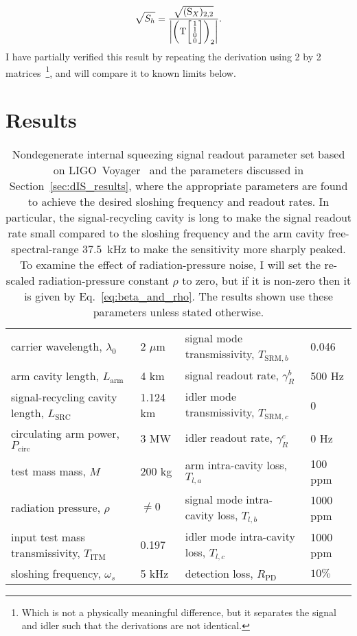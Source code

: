 \begin{equation}\label{eq:nIS_sigRO_sens}
\sqrt{S_h} = \frac{\sqrt{(\text{S}_X)_{2,2}}}{\abs{\left(\text{T}\begin{bsmallmatrix}1 \\1\\0\\0\end{bsmallmatrix}\right)_2}}.
\end{equation}
I have partially verified this result by repeating the derivation using 2 by 2 matrices~\footnote{Which is not a physically meaningful difference, but it separates the signal and idler such that the derivations are not identical.}, and will compare it to known limits below. %


\section{Results}
\label{sec:nIS_sigRO_results}

\begin{table}[]
\centering
\begin{tabular}{@{}ll|ll@{}}
\toprule
carrier wavelength, $\lambda_0$ & 2 $\mu\text{m}$ & signal mode transmissivity, $T_{\text{SRM},b}$ & 0.046 \\
arm cavity length, $L_\text{arm}$ & 4 km & signal readout rate, $\gamma^b_R$ & 500 Hz \\
signal-recycling cavity length, $L_\text{SRC}$ & 1.124 km & idler mode transmissivity, $T_{\text{SRM},c}$ & 0 \\
circulating arm power, $P_\text{circ}$ & 3 MW & idler readout rate, $\gamma^c_R$ & 0 Hz \\
test mass mass, $M$ & 200 kg & arm intra-cavity loss, $T_{l,a}$ & 100 ppm \\
radiation pressure, $\rho$ & $\neq0$ & signal mode intra-cavity loss, $T_{l,b}$ & 1000 ppm \\
input test mass transmissivity, $T_\text{ITM}$ & 0.197 & idler mode intra-cavity loss, $T_{l,c}$ & 1000 ppm \\
sloshing frequency, $\omega_s$ & 5 kHz & detection loss, $R_\text{PD}$ & $10\%$ \\ \bottomrule
\end{tabular}
\caption{Nondegenerate internal squeezing signal readout parameter set based on LIGO~Voyager~\cite{} and the parameters discussed in Section~\ref{sec:dIS_results}, where the appropriate parameters are found to achieve the desired sloshing frequency and readout rates. In particular, the signal-recycling cavity is long to make the signal readout rate small compared to the sloshing frequency and the arm cavity free-spectral-range 37.5~kHz to make the sensitivity more sharply peaked. To examine the effect of radiation-pressure noise, I will set the re-scaled radiation-pressure constant $\rho$ to zero, but if it is non-zero then it is given by Eq.~\ref{eq:beta_and_rho}. The results shown use these parameters unless stated otherwise.}
\label{tab:signal_RO_parameters}
\end{table}

